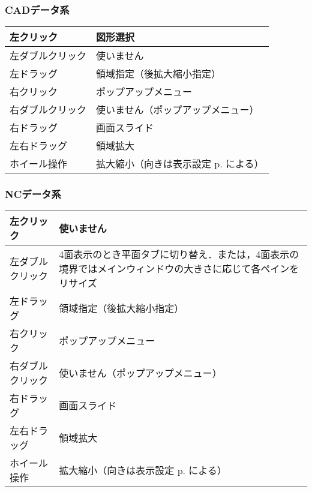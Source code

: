 \subsubsection{CADデータ系} \vspace*{-1zh}
\begin{table}[H]
\centering
\begin{tabular}{|p{5cm}|p{10cm}|}
\hline
左クリック & 図形選択 \\ \hline
左ダブルクリック & 使いません \\ \hline
左ドラッグ & 領域指定（後拡大縮小指定）\\ \hline \hline
右クリック & ポップアップメニュー \\ \hline
右ダブルクリック & 使いません（ポップアップメニュー）\\ \hline
右ドラッグ & 画面スライド \\ \hline \hline
左右ドラッグ & 領域拡大 \\ \hline \hline
ホイール操作 & 拡大縮小（向きは表示設定 p.\pageref{sec:gamen} による）\\ \hline
\end{tabular}
\end{table}

\subsubsection{NCデータ系} \vspace*{-1zh}
\begin{table}[H]
\centering
\begin{tabular}{|p{5cm}|p{10cm}|}
\hline
左クリック & 使いません \\ \hline
左ダブルクリック & 4面表示のとき平面タブに切り替え．または，4面表示の境界ではメインウィンドウの大きさに応じて各ペインをリサイズ \\ \hline
左ドラッグ & 領域指定（後拡大縮小指定）\\ \hline \hline
右クリック & ポップアップメニュー \\ \hline
右ダブルクリック & 使いません（ポップアップメニュー）\\ \hline
右ドラッグ & 画面スライド \\ \hline \hline
左右ドラッグ & 領域拡大 \\ \hline \hline
ホイール操作 & 拡大縮小（向きは表示設定 p.\pageref{sec:gamen} による）\\ \hline
\end{tabular}
\end{table}
